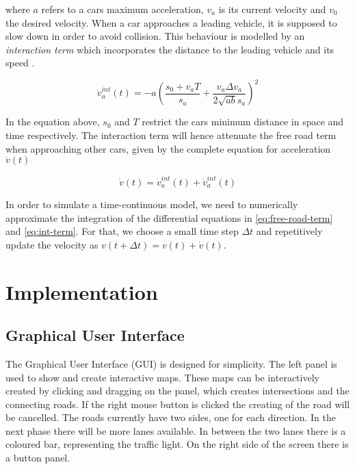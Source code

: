 \documentclass[10pt]{article}
\begin{document}
where $a$ refers to a cars maximum acceleration, $v_a$ is its current velocity and $v_0$ the desired velocity. When a car approaches a leading vehicle, it is supposed to slow down in order to avoid collision. This behaviour is modelled by an \textit{interaction term} which incorporates the distance to the leading vehicle and its speed \citep{treiber2000congested}. 

\begin{equation}
	\label{eq:int-term}
	\dot{v}_a^{int}(t) = - a ( \frac{s_0 + v_a T}{s_a} + \frac{v_a \Delta v_a}{2 \sqrt{ab} s_a} )^2
\end{equation}

In the equation above, $s_0$ and $T$ restrict the cars minimum distance in space and time respectively. The interaction term will hence attenuate the free road term when approaching other cars, given by the complete equation for acceleration $\dot{v}(t)$

\begin{equation}
	\dot{v}(t) = \dot{v}_a^{int}(t) + \dot{v}_a^{int}(t)
\end{equation}

In order to simulate a time-continuous model, we need to numerically approximate the integration of the differential equations in \ref{eq:free-road-term} and \ref{eq:int-term}. For that, we choose a small time step $\Delta t$ and repetitively update the velocity as $v(t + \Delta t) = v(t) + \dot{v}(t)$.

\section{Implementation}

\subsection{Graphical User Interface}
The Graphical User Interface (GUI) is designed for simplicity. The left panel is used to show and create interactive maps. These maps can be interactively created by clicking and dragging on the panel, which creates intersections and the connecting roads. If the right mouse button is clicked the creating of the road will be cancelled. The roads currently have two sides, one for each direction. In the next phase there will be more lanes available. In between the two lanes there is a coloured bar, representing the traffic light. On the right side of the screen there is a button panel.
\end{document}
